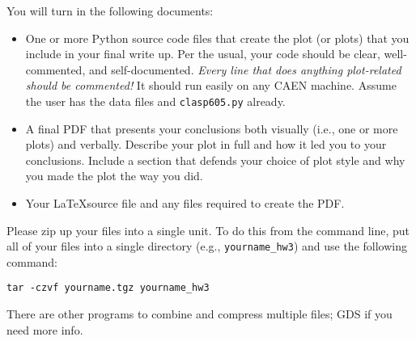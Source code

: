 \documentclass[12pt, letterpaper]{article}
\begin{document}
You will turn in the following documents:
\begin{itemize}
\item One or more Python source code files that create the plot (or plots)
  that you include in your final write up.  Per the usual, your code should
  be clear, well-commented, and self-documented.  \emph{Every line that does
    anything plot-related should be commented!}  It should run easily on
  any CAEN machine.  Assume the user has the data files and {\tt clasp605.py}
  already.
\item A final PDF that presents your conclusions both visually (i.e., one or
  more plots) and verbally.  Describe your plot in full and how it led you
  to your conclusions.  Include a section that defends your choice of plot
  style and why you made the plot the way you did.
\item Your \LaTeX source file and any files required to create the PDF.
\end{itemize}

Please zip up your files into a single unit.  To do this from the command line,
put all of your files into a single directory (e.g., {\tt yourname\_hw3}) and
use the following command:
\begin{verbatim}
tar -czvf yourname.tgz yourname_hw3
\end{verbatim}
There are other programs to combine and compress multiple files; GDS if you
need more info.
\end{document}

